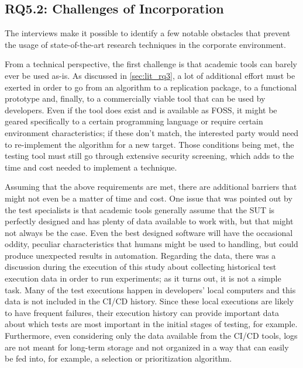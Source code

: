 \subsection{RQ5.2: Challenges of Incorporation}
\label{sec:ind_rq2}

The interviews make it possible to identify a few notable obstacles that prevent the usage of state-of-the-art research techniques in the corporate environment.

From a technical perspective, the first challenge is that academic tools can barely ever be used as-is.
As discussed in \autoref{sec:lit_rq3}, a lot of additional effort must be exerted in order to go from an algorithm to a replication package, to a functional prototype and, finally, to a commercially viable tool that can be used by developers.
Even if the tool does exist and is available as FOSS, it might be geared specifically to a certain programming language or require certain environment characteristics; if these don't match, the interested party would need to re-implement the algorithm for a new target.
Those conditions being met, the testing tool must still go through extensive security screening, which adds to the time and cost needed to implement a technique.

Assuming that the above requirements are met, there are additional barriers that might not even be a matter of time and cost.
One issue that was pointed out by the test specialists is that academic tools generally assume that the SUT is perfectly designed and has plenty of data available to work with, but that might not always be the case.
Even the best designed software will have the occasional oddity, peculiar characteristics that humans might be used to handling, but could produce unexpected results in automation.
Regarding the data, there was a discussion during the execution of this study about collecting historical test execution data in order to run experiments; as it turns out, it is not a simple task.
Many of the test executions happen in developers' local computers and this data is not included in the CI/CD history.
Since these local executions are likely to have frequent failures, their execution history can provide important data about which tests are most important in the initial stages of testing, for example.
Furthermore, even considering only the data available from the CI/CD tools, logs are not meant for long-term storage and not organized in a way that can easily be fed into, for example, a selection or prioritization algorithm.

